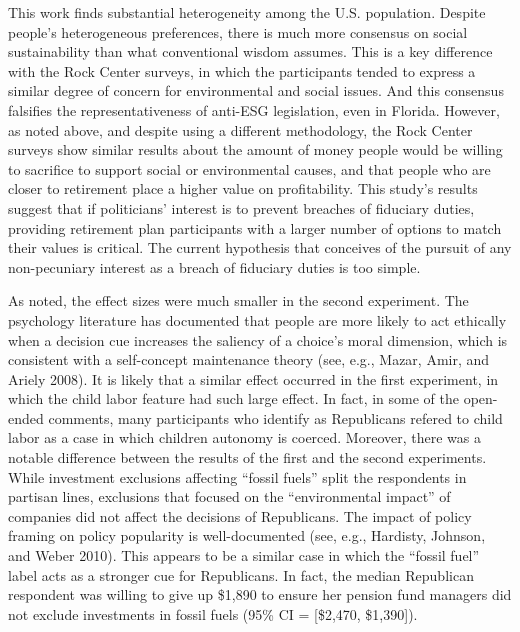 \documentclass[
  12pt,
]{article}
\begin{document}
This work finds substantial heterogeneity among the U.S. population. Despite people's heterogeneous preferences, there is much more consensus on social sustainability than what conventional wisdom assumes. This is a key difference with the Rock Center surveys, in which the participants tended to express a similar degree of concern for environmental and social issues. And this consensus falsifies the representativeness of anti-ESG legislation, even in Florida. However, as noted above, and despite using a different methodology, the Rock Center surveys show similar results about the amount of money people would be willing to sacrifice to support social or environmental causes, and that people who are closer to retirement place a higher value on profitability. This study's results suggest that if politicians' interest is to prevent breaches of fiduciary duties, providing retirement plan participants with a larger number of options to match their values is critical. The current hypothesis that conceives of the pursuit of any non-pecuniary interest as a breach of fiduciary duties is too simple.

As noted, the effect sizes were much smaller in the second experiment. The psychology literature has documented that people are more likely to act ethically when a decision cue increases the saliency of a choice's moral dimension, which is consistent with a self-concept maintenance theory (see, e.g., Mazar, Amir, and Ariely 2008). It is likely that a similar effect occurred in the first experiment, in which the child labor feature had such large effect. In fact, in some of the open-ended comments, many participants who identify as Republicans refered to child labor as a case in which children autonomy is coerced. Moreover, there was a notable difference between the results of the first and the second experiments. While investment exclusions affecting ``fossil fuels'' split the respondents in partisan lines, exclusions that focused on the ``environmental impact'' of companies did not affect the decisions of Republicans. The impact of policy framing on policy popularity is well-documented (see, e.g., Hardisty, Johnson, and Weber 2010). This appears to be a similar case in which the ``fossil fuel'' label acts as a stronger cue for Republicans. In fact, the median Republican respondent was willing to give up \$1,890 to ensure her pension fund managers did not exclude investments in fossil fuels (95\% CI = {[}\$2,470, \$1,390{]}).
\end{document}
